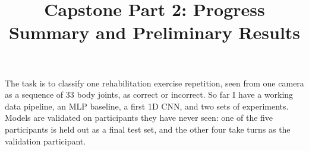 

\title{Capstone Part 2: Progress Summary and Preliminary Results}


\maketitle

The task is to classify one rehabilitation exercise repetition, seen from one camera as a sequence of 33
body joints, as correct or incorrect. So far I have a working data pipeline, an MLP baseline, a first 1D
CNN, and two sets of experiments. Models are validated on participants they have never seen: one of the
five participants is held out as a final test set, and the other four take turns as the validation
participant.

